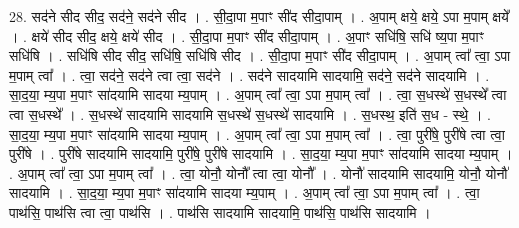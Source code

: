 \documentclass[17pt]{extarticle}
\begin{document}
28. सद॑ने सीद सीद॒ सद॑ने॒ सद॑ने सीद । . सी॒दा॒पा म॒पाꣳ सी॑द सीदा॒पाम् । . अ॒पाम् क्षये॒ क्षये॒ ऽपा म॒पाम् क्षये᳚ । . क्षये॑ सीद सीद॒ क्षये॒ क्षये॑ सीद । . सी॒दा॒पा म॒पाꣳ सी॑द सीदा॒पाम् । . अ॒पाꣳ सधि॑षि॒ सधि॑ ष्य॒पा म॒पाꣳ सधि॑षि । . सधि॑षि सीद सीद॒ सधि॑षि॒ सधि॑षि सीद । . सी॒दा॒पा म॒पाꣳ सी॑द सीदा॒पाम् । . अ॒पाम् त्वा᳚ त्वा॒ ऽपा म॒पाम् त्वा᳚ । . त्वा॒ सद॑ने॒ सद॑ने त्वा त्वा॒ सद॑ने । . सद॑ने सादयामि सादयामि॒ सद॑ने॒ सद॑ने सादयामि । . सा॒द॒या॒ म्य॒पा म॒पाꣳ सा॑दयामि सादया म्य॒पाम् । . अ॒पाम् त्वा᳚ त्वा॒ ऽपा म॒पाम् त्वा᳚ । . त्वा॒ स॒धस्थे॑ स॒धस्थे᳚ त्वा त्वा स॒धस्थे᳚ । . स॒धस्थे॑ सादयामि सादयामि स॒धस्थे॑ स॒धस्थे॑ सादयामि । . स॒धस्थ॒ इति॑ स॒ध - स्थे॒ । . सा॒द॒या॒ म्य॒पा म॒पाꣳ सा॑दयामि सादया म्य॒पाम् । . अ॒पाम् त्वा᳚ त्वा॒ ऽपा म॒पाम् त्वा᳚ । . त्वा॒ पुरी॑षे॒ पुरी॑षे त्वा त्वा॒ पुरी॑षे । . पुरी॑षे सादयामि सादयामि॒ पुरी॑षे॒ पुरी॑षे सादयामि । . सा॒द॒या॒ म्य॒पा म॒पाꣳ सा॑दयामि सादया म्य॒पाम् । . अ॒पाम् त्वा᳚ त्वा॒ ऽपा म॒पाम् त्वा᳚ । . त्वा॒ योनौ॒ योनौ᳚ त्वा त्वा॒ योनौ᳚ । . योनौ॑ सादयामि सादयामि॒ योनौ॒ योनौ॑ सादयामि । . सा॒द॒या॒ म्य॒पा म॒पाꣳ सा॑दयामि सादया म्य॒पाम् । . अ॒पाम् त्वा᳚ त्वा॒ ऽपा म॒पाम् त्वा᳚ । . त्वा॒ पाथ॑सि॒ पाथ॑सि त्वा त्वा॒ पाथ॑सि । . पाथ॑सि सादयामि सादयामि॒ पाथ॑सि॒ पाथ॑सि सादयामि । \newline
\end{document}

